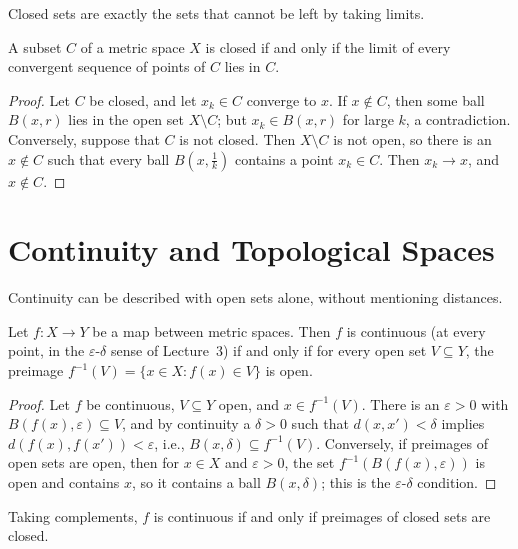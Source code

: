 Closed sets are exactly the sets that cannot be left by taking limits.

\begin{proposition}\label{A-prop:closed-limits}
    A subset $C$ of a metric space $X$ is closed if and only if the limit of every convergent sequence of points of $C$ lies in $C$.
\end{proposition}

\begin{proof}
    Let $C$ be closed, and let $x_k \in C$ converge to $x$. If $x \notin C$, then some ball $B(x, r)$ lies in the open set $X \setminus C$; but $x_k \in B(x, r)$ for large $k$, a contradiction. Conversely, suppose that $C$ is not closed. Then $X \setminus C$ is not open, so there is an $x \notin C$ such that every ball $B(x, \frac{1}{k})$ contains a point $x_k \in C$. Then $x_k \to x$, and $x \notin C$.
\end{proof}

\section{Continuity and Topological Spaces}\label{A-sec:continuity}

Continuity can be described with open sets alone, without mentioning distances.

\begin{proposition}\label{A-prop:continuity-open}
    Let $f: X \to Y$ be a map between metric spaces. Then $f$ is continuous (at every point, in the $\varepsilon$-$\delta$ sense of Lecture~3) if and only if for every open set $V \subseteq Y$, the preimage $f^{-1}(V) = \{x \in X : f(x) \in V\}$ is open.
\end{proposition}

\begin{proof}
    Let $f$ be continuous, $V \subseteq Y$ open, and $x \in f^{-1}(V)$. There is an $\varepsilon > 0$ with $B(f(x), \varepsilon) \subseteq V$, and by continuity a $\delta > 0$ such that $d(x, x') < \delta$ implies $d(f(x), f(x')) < \varepsilon$, i.e., $B(x, \delta) \subseteq f^{-1}(V)$. Conversely, if preimages of open sets are open, then for $x \in X$ and $\varepsilon > 0$, the set $f^{-1}(B(f(x), \varepsilon))$ is open and contains $x$, so it contains a ball $B(x, \delta)$; this is the $\varepsilon$-$\delta$ condition.
\end{proof}

Taking complements, $f$ is continuous if and only if preimages of closed sets are closed.

